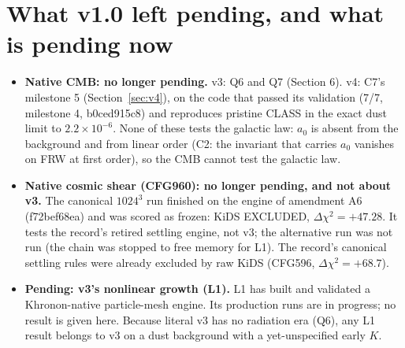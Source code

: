 \documentclass[10pt]{article}
\begin{document}
\section{What v1.0 left pending, and what is pending now}\label{sec:pending}
\begin{itemize}
\item \textbf{Native CMB: no longer pending.} v3: Q6 and Q7 (Section 6). v4: C7's milestone 5 (Section~\ref{sec:v4}), on the code that passed its validation (7/7, milestone 4, b0ced915c8) and reproduces pristine CLASS in the exact dust limit to $2.2\times10^{-6}$. None of these tests the galactic law: $a_0$ is absent from the background and from linear order (C2: the invariant that carries $a_0$ vanishes on FRW at first order), so the CMB cannot test the galactic law.
\item \textbf{Native cosmic shear (CFG960): no longer pending, and not about v3.} The canonical $1024^3$ run finished on the engine of amendment A6 (f72bef68ea) and was scored as frozen: KiDS EXCLUDED, $\Delta\chi^2=+47.28$. It tests the record's retired settling engine, not v3; the alternative run was not run (the chain was stopped to free memory for L1). The record's canonical settling rules were already excluded by raw KiDS (CFG596, $\Delta\chi^2=+68.7$).
\item \textbf{Pending: v3's nonlinear growth (L1).} L1 has built and validated a Khronon-native particle-mesh engine. Its production runs are in progress; no result is given here. Because literal v3 has no radiation era (Q6), any L1 result belongs to v3 on a dust background with a yet-unspecified early $K$.
\end{itemize}
\end{document}
